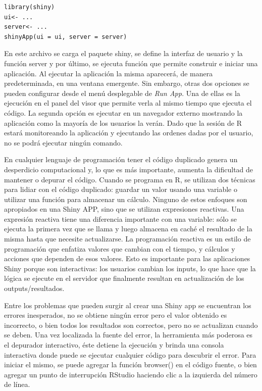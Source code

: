 \begin{lstlisting}
library(shiny)
ui<- ...
server<- ...
shinyApp(ui = ui, server = server)
\end{lstlisting}

En este archivo se carga el paquete shiny, se define la interfaz de usuario y la función server y por último, se ejecuta función que permite construir e iniciar una aplicación. Al ejecutar la aplicación la misma aparecerá, de manera predeterminada, en una ventana emergente. Sin embargo, otras dos opciones se pueden configurar desde el menú desplegable de \emph{Run App}. Una de ellas es la ejecución en el panel del visor que permite verla al mismo tiempo que ejecuta el código. La segunda opción es ejecutar en un navegador externo mostrando la aplicación como la mayoría de los usuarios la verán. Dado que la sesión de R estará monitoreando la aplicación y ejecutando las ordenes dadas por el usuario, no se podrá ejecutar ningún comando.

En cualquier lenguaje de programación tener el código duplicado genera un desperdicio computacional y, lo que es más importante, aumenta la dificultad de mantener o depurar el código. Cuando se programa en R, se utilizan dos técnicas para lidiar con el código duplicado: guardar un valor usando una variable o utilizar una función para almacenar un cálculo. Ninguno de estos enfoques son apropiados en una Shiny APP, sino que se utilizan expresiones reactivas. Una expresión reactiva tiene una diferencia importante con una variable: sólo se ejecuta la primera vez que se llama y luego almacena en caché el resultado de la misma hasta que necesite actualizarse. La programación reactiva es un estilo de programación que enfatiza valores que cambian con el tiempo, y cálculos y acciones que dependen de esos valores. Esto es importante para las aplicaciones Shiny porque son interactivas: los usuarios cambian los inputs, lo que hace que la lógica se ejecute en el servidor que finalmente resultan en actualización de los outputs/resultados.

Entre los problemas que pueden surgir al crear una Shiny app se encuentran los errores inesperados, no se obtiene ningún error pero el valor obtenido es incorrecto, o bien todos los resultados son correctos, pero no se actualizan cuando se deben. Una vez localizada la fuente del error, la herramienta más poderosa es el depurador interactivo, éste detiene la ejecución y brinda una consola interactiva donde puede se ejecutar cualquier código para descubrir el error. Para iniciar el mismo, se puede agregar la función browser() en el código fuente, o bien agregar un punto de interrupción RStudio haciendo clic a la izquierda del número de línea.

